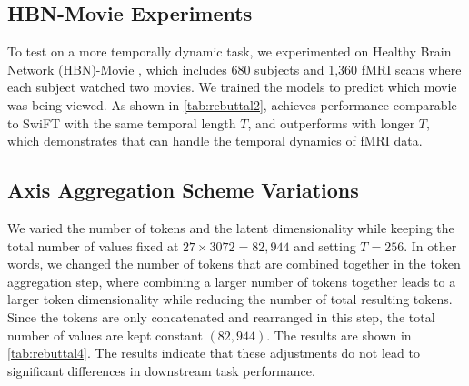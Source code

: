 \subsection{HBN-Movie Experiments}
\label{sec:hbn}
To test on a more temporally dynamic task, we experimented on Healthy Brain Network (HBN)-Movie \cite{HBN}, which includes 680 subjects and 1,360 fMRI scans where each subject watched two movies. We trained the models to predict which movie was being viewed. As shown in \cref{tab:rebuttal2}, {\ours} achieves performance comparable to SwiFT with the same temporal length $T$, and outperforms with longer $T$, which demonstrates that {\ours} can handle the temporal dynamics of fMRI data.
\begin{table}[h!]
\caption{Results on HBN-Movie.}
\centering
{}
\label{tab:rebuttal2}
\vspace{-0.15in}
\end{table}

\subsection{Axis Aggregation Scheme Variations}
\label{sec:variation_tokenization}
We varied the number of tokens and the latent dimensionality while keeping the total number of values fixed at $27 \times 3072 = 82{,}944$ and setting $T=256$. In other words, we changed the number of tokens that are combined together in the token aggregation step, where combining a larger number of tokens together leads to a larger token dimensionality while reducing the number of total resulting tokens. Since the tokens are only concatenated and rearranged in this step, the total number of values are kept constant $(82{,}944)$. The results are shown in \cref{tab:rebuttal4}. The results indicate that these adjustments do not lead to significant differences in downstream task performance.
 
